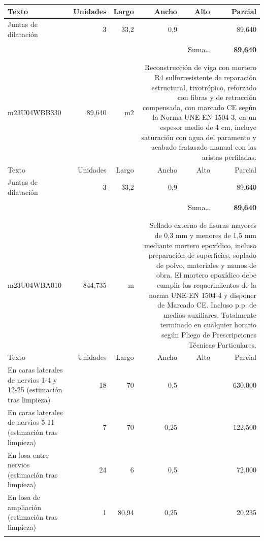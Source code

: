 \documentclass{book}%
\begin{document}
\begin{longtable}{lrrrrr}
Texto&Unidades&Largo&Ancho&Alto&Parcial\\%
\hline%
\multicolumn{1}{p{3.5cm}}{Juntas de dilatación}&3&33,2&0,9&&    89,640\\%
&&&&&\\%
\multicolumn{5}{r}{Suma\ldots}&\textbf{    89,640}\\%
\hline%
&&&&&\\%
&&&&&\\%
m23U04WBB330&    89,640& m2&\multicolumn{3}{p{6cm}}{\scriptsize Reconstrucción de viga con mortero R4 sulforresistente de reparación estructural, tixotrópico, reforzado con fibras y de retracción compensada, con marcado CE según la Norma UNE-EN 1504-3, en un espesor medio de 4 cm, incluye saturación con agua del paramento y acabado fratasado manual con las aristas perfiladas.\normalsize}\\%
Texto&Unidades&Largo&Ancho&Alto&Parcial\\%
\hline%
\multicolumn{1}{p{3.5cm}}{Juntas de dilatación}&3&33,2&0,9&&    89,640\\%
&&&&&\\%
\multicolumn{5}{r}{Suma\ldots}&\textbf{    89,640}\\%
\hline%
&&&&&\\%
&&&&&\\%
m23U04WBA010&   844,735& m&\multicolumn{3}{p{6cm}}{\scriptsize Sellado externo de fisuras mayores de 0,3 mm y menores de 1,5 mm mediante mortero epoxídico, incluso preparación de superficies, soplado de polvo, materiales y manos de obra. El mortero epoxídico debe cumplir los requerimientos de la norma UNE-EN 1504-4 y disponer de Marcado CE. Incluso p.p. de medios auxiliares. Totalmente terminado en cualquier horario según Pliego de Prescripciones Técnicas Particulares.\normalsize}\\%
Texto&Unidades&Largo&Ancho&Alto&Parcial\\%
\hline%
\multicolumn{1}{p{3.5cm}}{En caras laterales de nervios 1{-}4 y 12{-}25 (estimación tras limpieza)}&18&70&0,5&&   630,000\\%
\multicolumn{1}{p{3.5cm}}{En caras laterales de nervios 5{-}11 (estimación tras limpieza)}&7&70&0,25&&   122,500\\%
\multicolumn{1}{p{3.5cm}}{En losa entre nervios (estimación tras limpieza)}&24&6&0,5&&    72,000\\%
\multicolumn{1}{p{3.5cm}}{En losa de ampliación (estimación tras limpieza)}&1&80,94&0,25&&    20,235\\%
&&&&&\\%

\end{longtable}
\end{document}
